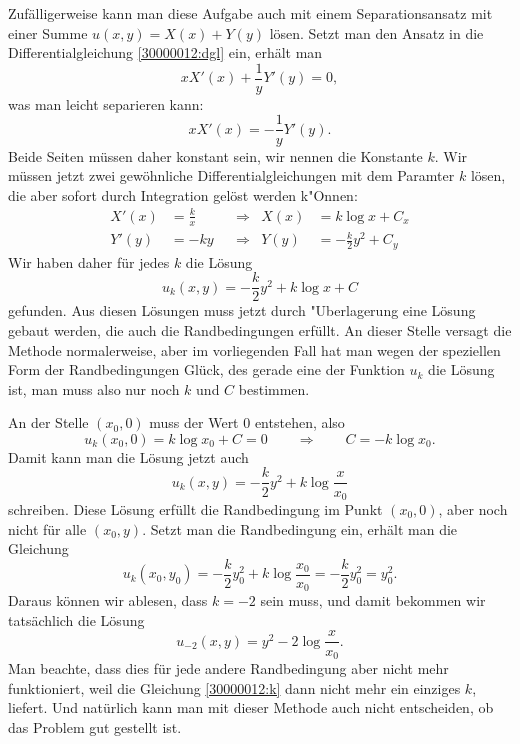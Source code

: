 \begin{diskussion}
Zufälligerweise kann man diese Aufgabe auch mit einem Separationsansatz
mit einer Summe $u(x,y)= X(x) + Y(y)$ lösen.
Setzt man den Ansatz in die Differentialgleichung \eqref{30000012:dgl} ein,
erhält man
\[
xX'(x) +\frac1yY'(y)=0,
\]
was man leicht separieren kann:
\[
xX'(x) = - \frac1yY'(y).
\]
Beide Seiten müssen daher konstant sein, wir nennen die Konstante $k$.
Wir müssen jetzt zwei gewöhnliche Differentialgleichungen mit dem Paramter
$k$ lösen, die aber sofort durch Integration gelöst werden k"Onnen:
\begin{align*}
X'(x)&=\frac{k}{x}&&\Rightarrow&X(x)&=k\log x + C_x      \\
Y'(y)&=-ky        &&\Rightarrow&Y(y)&=-\frac{k}2y^2 + C_y
\end{align*}
Wir haben daher für jedes $k$ die Lösung
\[
u_k(x,y)=-\frac{k}2 y^2 + k\log x + C
\]
gefunden.
Aus diesen Lösungen muss jetzt durch "Uberlagerung eine Lösung 
gebaut werden, die auch die Randbedingungen erfüllt.
An dieser Stelle versagt die Methode normalerweise, aber im vorliegenden
Fall hat man wegen der speziellen Form der Randbedingungen Glück, des
gerade eine der Funktion $u_k$ die Lösung ist, man muss also
nur noch $k$ und $C$ bestimmen.

An der Stelle $(x_0,0)$ muss der Wert $0$ entstehen, also
\[
u_k(x_0,0) = k\log x_0 + C=0
\qquad\Rightarrow\qquad C=-k\log x_0.
\]
Damit kann man die Lösung jetzt auch
\[
u_k(x,y)=-\frac{k}{2}y^2 +k\log\frac{x}{x_0}
\]
schreiben.
Diese Lösung erfüllt die Randbedingung im Punkt $(x_0,0)$, aber noch
nicht für alle $(x_0,y)$.
Setzt man die Randbedingung ein, erhält man die Gleichung
\begin{equation}
u_k(x_0,y_0) = -\frac{k}{2}y_0^2 +k\log\frac{x_0}{x_0} = -\frac{k}{2}y_0^2=y_0^2.
\label{30000012:k}
\end{equation}
Daraus können wir ablesen, dass $k=-2$ sein muss, und damit bekommen
wir tatsächlich die Lösung
\[
u_{-2}(x,y)=y^2 -2\log\frac{x}{x_0}.
\]
Man beachte, dass dies für jede andere Randbedingung aber nicht mehr
funktioniert, weil die Gleichung \eqref{30000012:k} dann nicht mehr
ein einziges $k$, liefert.
Und natürlich kann man mit dieser Methode auch nicht entscheiden, ob
das Problem gut gestellt ist.


\end{diskussion}
